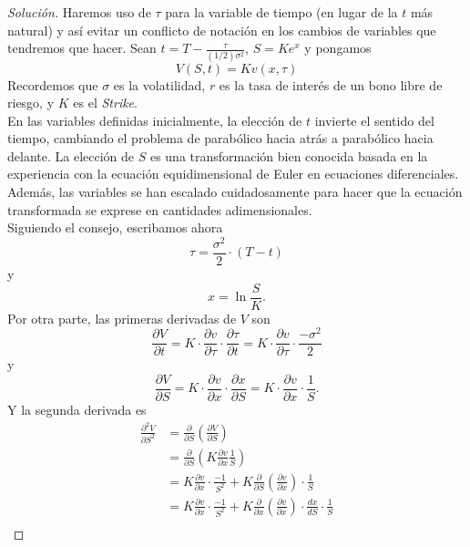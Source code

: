 \documentclass[11pt,notitlepage]{article}
\newenvironment{solucion}
  {\begin{proof}[Solución]}
  {\end{proof}}
\begin{document}
\begin{solucion}
    Haremos uso de $\tau$ para la variable de tiempo (en lugar de la $t$ más natural) y así evitar un conflicto de notación en los cambios de variables que tendremos que hacer.
    Sean $t = T - \frac{\tau}{(1/2)\sigma^2}$, $S = Ke^x$ y pongamos 
    $$ V(S,t) = Kv(x,\tau)$$
    Recordemos que $\sigma$ es la volatilidad, $r$ es la tasa de interés de un bono libre de riesgo, y $K$ es el \textit{Strike}.\\
    En las variables definidas inicialmente, la elección de $t$ invierte el sentido del tiempo, cambiando el problema de parabólico hacia atrás a parabólico hacia delante. La elección de $S$ es una transformación bien conocida basada en la experiencia con la ecuación equidimensional de Euler en ecuaciones diferenciales. Además, las variables se han escalado cuidadosamente para hacer que la ecuación transformada se exprese en cantidades adimensionales.\\
    \noindent
    Siguiendo el consejo, escribamos ahora $$ \tau = \frac{\sigma^2}{2} \cdot (T - t)$$ y $$ x = \ln{\frac{S}{K}}.$$
    Por otra parte, las primeras derivadas de $V$ son
    \begin{equation}
        \label{eq:dVt}
        \frac{\partial V}{\partial t} = K \cdot \frac{\partial v}{\partial \tau} \cdot \frac{\partial \tau}{\partial t} = K \cdot \frac{\partial v}{\partial \tau} \cdot \frac{-\sigma^2}{2}
    \end{equation}
    y
    \begin{equation}
        \label{eq:dVS}
        \frac{\partial V}{\partial S} = K \cdot \frac{\partial v}{\partial x} \cdot \frac{\partial x}{\partial S} = K \cdot \frac{\partial v}{\partial x} \cdot \frac{1}{S}.
    \end{equation}
    Y la segunda derivada es
    \begin{align*}
        \frac{\partial ^2 V}{\partial S^2} &= \frac{\partial}{\partial S} \left( \frac{\partial V}{\partial S}\right)\\
        &= \frac{\partial}{\partial S} \left( K \frac{\partial v}{\partial x} \frac{1}{S} \right)\\
        &= K \frac{\partial v}{\partial x} \cdot \frac{-1}{S^2} + K \frac{\partial}{\partial S} \left( \frac{\partial v}{\partial x}\right) \cdot \frac{1}{S}\\
        &= K \frac{\partial v}{\partial x} \cdot \frac{-1}{S^2} + K \frac{\partial}{\partial x} \left( \frac{\partial v}{\partial x}\right) \cdot \frac{dx}{dS} \cdot \frac{1}{S}\\

\end{align*}
\end{solucion}
\end{document}
